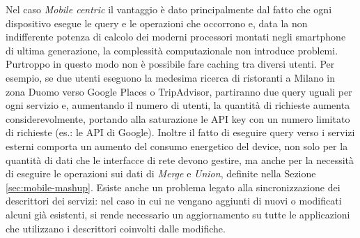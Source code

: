 Nel caso \emph{Mobile centric} il vantaggio è dato principalmente dal fatto che ogni dispositivo esegue le query e le operazioni che occorrono e, data la non indifferente potenza di calcolo dei moderni processori montati negli smartphone di ultima generazione, la complessità computazionale non introduce problemi.
Purtroppo in questo modo non è possibile fare caching tra diversi utenti. Per esempio, se due utenti eseguono la medesima ricerca di ristoranti a Milano in zona Duomo verso Google Places o TripAdvisor, partiranno due query uguali per ogni servizio e, aumentando il numero di utenti, la quantità di richieste aumenta considerevolmente, portando alla saturazione le API key con un numero limitato di richieste (es.: le API di Google). Inoltre il fatto di eseguire query verso i servizi esterni comporta un aumento del consumo energetico del device, non solo per la quantità di dati che le interfacce di rete devono gestire, ma anche per la necessità di eseguire le operazioni sui dati di \emph{Merge} e \emph{Union}, definite nella Sezione \ref{sec:mobile-mashup}. 
Esiste anche un problema legato alla sincronizzazione dei descrittori dei servizi: nel caso in cui ne vengano aggiunti di nuovi o modificati alcuni già esistenti, si rende necessario un aggiornamento su tutte le applicazioni che utilizzano i descrittori coinvolti dalle modifiche.

